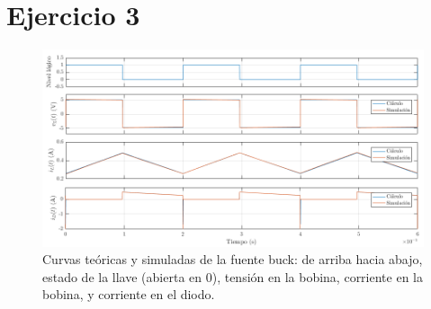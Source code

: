 \documentclass[e4_tp1_main.tex]{subfiles}
\begin{document}
\section{Ejercicio 3}



\begin{landscape}
	\vspace*{\fill}
	\begin{figure}[ht]
		\centering
		\includegraphics[scale=0.75]{images/ej2/curvas.png}
		\caption{Curvas te\'oricas y simuladas de la fuente buck: de arriba hacia abajo, estado de la llave (abierta en 0), tensi\'on en la bobina, corriente en la bobina, y corriente en el diodo.}
		\label{fig:buck-curvas}
	\end{figure}
	\vspace*{\fill}
\end{landscape}
\end{document}
